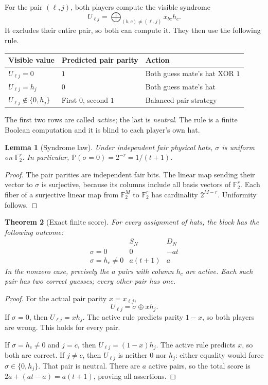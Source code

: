 \documentclass[11pt,letterpaper]{article}
\newtheorem{theorem}{Theorem}[section]
\newtheorem{lemma}[theorem]{Lemma}
\theoremstyle{definition}
\newcommand{\Prb}{\mathbb P}
\newcommand{\F}{\mathbb F}
\newcommand{\xor}{\mathbin{\oplus}}
\begin{document}
For the pair \((\ell,j)\), both players compute the visible syndrome
\[
  U_{\ell j}=
  \bigoplus_{(b,c)\ne(\ell,j)}x_{bc}h_c.
\]
It excludes their entire pair, so both can compute it.
They then use the following rule.

\begin{center}
\begin{tabular}{lll}
\toprule
Visible value & Predicted pair parity & Action\\
\midrule
\(U_{\ell j}=0\) & \(1\) & Both guess mate's hat XOR \(1\)\\
\(U_{\ell j}=h_j\) & \(0\) & Both guess mate's hat\\
\(U_{\ell j}\notin\{0,h_j\}\) & First \(0\), second \(1\) &
Balanced pair strategy\\
\bottomrule
\end{tabular}
\end{center}
The first two rows are called \emph{active}; the last is \emph{neutral}.
The rule is a finite Boolean computation and it is blind to each
player's own hat.

\begin{lemma}[Syndrome law]\label{mbg:hat:lem:syndrome-law}
Under independent fair physical hats, \(\sigma\) is uniform on
\(\F_2^r\). In particular, \(\Prb(\sigma=0)=2^{-r}=1/(t+1)\).
\end{lemma}
\begin{proof}
The pair parities are independent fair bits. The linear map sending
their vector to \(\sigma\) is surjective, because its columns include
all basis vectors of \(\F_2^r\). Each fiber of a surjective linear map
from \(\F_2^M\) to \(\F_2^r\) has cardinality \(2^{M-r}\).
Uniformity follows.
\end{proof}

\begin{theorem}[Exact finite score]\label{mbg:hat:thm:block-law}
For every assignment of hats, the block has the following outcome:
\[
\begin{array}{c|c|c}
 & S_N & D_N\\ \hline
\sigma=0 & 0 & -at\\
\sigma=h_c\ne0 & a(t+1) & a
\end{array}                                                   \tag{20.2}\label{mbg:hat:eq:block-law}
\]
In the nonzero case, precisely the \(a\) pairs with column \(h_c\)
are active. Each such pair has two correct guesses; every other pair
has one.
\end{theorem}
\begin{proof}
For the actual pair parity \(x=x_{\ell j}\),
\[
  U_{\ell j}=\sigma\xor xh_j.
\]
If \(\sigma=0\), then \(U_{\ell j}=xh_j\). The active rule predicts
parity \(1-x\), so both players are wrong. This holds for every pair.

If \(\sigma=h_c\ne0\) and \(j=c\), then
\(U_{\ell j}=(1-x)h_j\). The active rule predicts \(x\), so both are
correct. If \(j\ne c\), then \(U_{\ell j}\) is neither \(0\) nor
\(h_j\): either equality would force \(\sigma\in\{0,h_j\}\).
That pair is neutral. There are \(a\) active pairs, so the total score
is \(2a+(at-a)=a(t+1)\), proving all assertions.
\end{proof}
\end{document}
